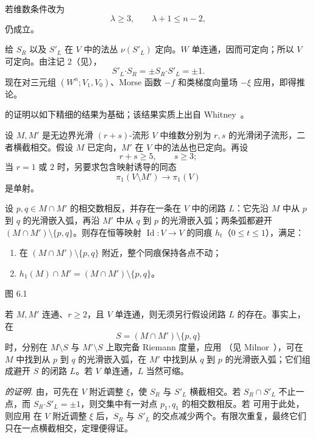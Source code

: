 若维数条件改为
\[
  \lambda\geq3,
  \qquad
  \lambda+1\leq n-2,
\]
 仍成立。

\Proof 给 $S_R$ 以及 $S'_L$ 在 $V$ 中的法丛 $\nu(S'_L)$ 定向。$W$ 单连通，因而可定向；所以 $V$ 可定向。由注记 2（见），
\[
  S'_L\mathbin{\boldsymbol\cdot}S_R
  =\pm S_R\mathbin{\boldsymbol\cdot}S'_L
  =\pm1.
\]
现在对三元组 $(W^n;V_1,V_0)$、Morse 函数 $-f$ 和类梯度向量场 $-\xi$ 应用，即得推论。
\EndProof

 的证明以如下精细的结果为基础；该结果实质上出自 Whitney~\cite{ref07}。

\label{barden:thm66-start}设 $M,M'$ 是无边界光滑 $(r+s)$-流形 $V$ 中维数分别为 $r,s$ 的光滑闭子流形，二者横截相交。假设 $M$ 已定向，$M'$ 在 $V$ 中的法丛也已定向。再设
\[
  r+s\geq5,
  \qquad s\geq3;
\]
当 $r=1$ 或 $2$ 时，另要求包含映射诱导的同态
\[
  \pi_1(V\setminus M')\longrightarrow\pi_1(V)
\]
是单射。

设 $p,q\in M\cap M'$ 的相交数相反，并存在一条在 $V$ 中的闭路 $L$：它先沿 $M$ 中从 $p$ 到 $q$ 的光滑嵌入弧，再沿 $M'$ 中从 $q$ 到 $p$ 的光滑嵌入弧；两条弧都避开
$(M\cap M')\setminus\{p,q\}$。则存在恒等映射 $\operatorname{Id}:V\to V$ 的同痕 $h_t$（$0\leq t\leq1$），满足：
\begin{enumerate}[label=(\roman*)]
  \item 在 $(M\cap M')\setminus\{p,q\}$ 附近，整个同痕保持各点不动；
  \item $h_1(M)\cap M'=(M\cap M')\setminus\{p,q\}$。
\end{enumerate}
\label{barden:thm66-end}

\begin{center}
  \FigSixOne

  \label{fig:6.1}图 6.1
\end{center}

\Remark 若 $M,M'$ 连通、$r\geq2$，且 $V$ 单连通，则无须另行假设闭路 $L$ 的存在。事实上，在
\[
  S=(M\cap M')\setminus\{p,q\}
\]
时，分别在 $M\setminus S$ 与 $M'\setminus S$ 上取完备 Riemann 度量，应用 （见 Milnor~\cite[p.~62]{ref04}），可在 $M$ 中找到从 $p$ 到 $q$ 的光滑嵌入弧，在 $M'$ 中找到从 $q$ 到 $p$ 的光滑嵌入弧；它们组成避开 $S$ 的闭路 $L$。若 $V$ 单连通，$L$ 当然可缩。

\par\medskip\noindent\textit{ 的证明.}\quad
由，可先在 $V$ 附近调整 $\xi$，使 $S_R$ 与 $S'_L$ 横截相交。若 $S_R\cap S'_L$ 不止一点，而
$S_R\mathbin{\boldsymbol\cdot}S'_L=\pm1$，则交集中有一对点 $p_1,q_1$ 的相交数相反。若 可用于此处，则应用 在 $V$ 附近调整 $\xi$ 后，$S_R$ 与 $S'_L$ 的交点减少两个。有限次重复，最终它们只在一点横截相交，定理便得证。


